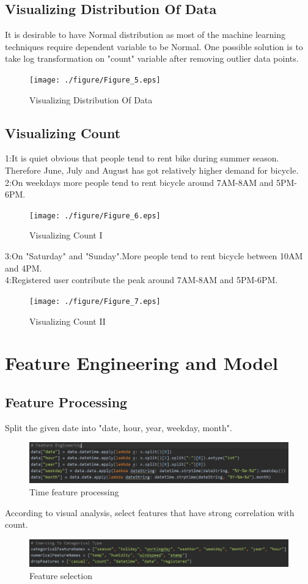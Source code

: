 \subsection{Visualizing Distribution Of Data}
 It is desirable to have Normal distribution as most of the machine learning techniques require dependent variable to be Normal. One possible solution is to take log transformation on "count" variable after removing outlier data points.
\begin{figure}[htbp]
	\texttt{[image: ./figure/Figure\_5.eps]}
	\caption{Visualizing Distribution Of Data}
\end{figure}

\subsection{Visualizing Count}
1:It is quiet obvious that people tend to rent bike during summer season. Therefore June, July and August has got relatively higher demand for bicycle.\\
2:On weekdays more people tend to rent bicycle around 7AM-8AM and 5PM-6PM. 
\begin{figure}[htbp]
	\texttt{[image: ./figure/Figure\_6.eps]}
	\caption{Visualizing Count I}
\end{figure}
3:On "Saturday" and "Sunday".More people tend to rent bicycle between 10AM and 4PM.\\
4:Registered user contribute the peak around 7AM-8AM and 5PM-6PM.
\begin{figure}[htbp]
	\texttt{[image: ./figure/Figure\_7.eps]}
	\caption{Visualizing Count II}
\end{figure}


\section{Feature Engineering and Model} \label{sec-method}
\subsection{Feature Processing}
Split the given date into "date, hour, year, weekday, month".
\begin{figure}[htbp]
	\includegraphics[scale=0.5]{./figure/1.eps}
	\caption{Time feature processing}
\end{figure}
According to visual analysis, select features that have strong correlation with count.
\begin{figure}[htbp]
	\includegraphics[scale=0.5]{./figure/2.eps}
	\caption{Feature selection}
\end{figure}

